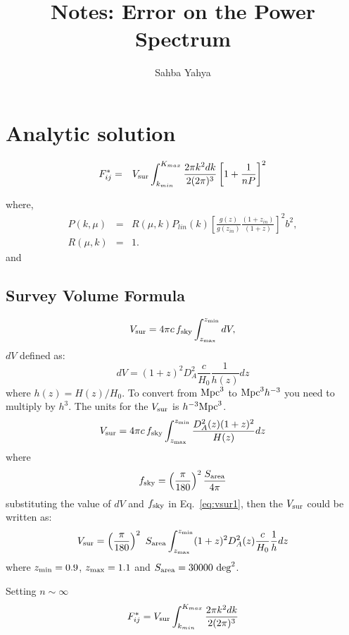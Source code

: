\documentclass[10pt,a4paper]{article}
\title{Notes: Error on the Power Spectrum}
\author{Sahba Yahya}
\begin{document}
\maketitle


\section{Analytic solution }
\begin{eqnarray}\label{FIJ_DEV}
F_{ij}^*&=& V_{\rm sur} \int_{k_{min}}^{K_{max}} \frac{ 2 \pi k^2 dk}{2 (2 \pi)^3} \left[1+\frac{1}{nP}\right]^2
\end{eqnarray}

where,
\begin{eqnarray}
P(k,\mu)&=& R(\mu,k)P_{lin}(k) \left[\frac{g(z)}{g(z_{in})} \frac{(1+z_{in})}{(1+z)}\right]^2 b^2,\\
R(\mu,k)& =&1.\label{eq:Rsig}
\end{eqnarray}
and
\subsection{Survey Volume Formula}
\begin{equation}\label{eq:vsur1}
V_{\rm sur} =4 \pi c \,f_{\rm sky} \int^{z_{\rm min}}_{z_{\rm max}} dV, 
\end{equation}
$dV$ defined as:\[dV=  (1+z)^2D_A^2 \frac{c }{H_0} \frac{1}{h(z)} dz \]
where $h(z) = H(z)/H_0$. 
To convert from ${\rm Mpc}^3$ to ${\rm Mpc}^3 h^{-3}$ you need to multiply by $h^3$. The units for the $V_{\rm sur}$ is $h^{-3} {\rm Mpc}^3$.
\begin{equation}
V_{\rm sur} = 4 \pi c \,f_{\rm sky} \int^{z_{\rm min}}_{z_{\rm max}}  \frac{D_A^2(z)( 1+z)^2}{H(z)}  dz
\end{equation}
where 
\begin{equation}
f_{\rm sky} =   \left(\frac{\pi}{180}\right)^2 \frac{S_{\rm area }}{4 \pi}
\end{equation}
substituting the value of $dV$ and $f_{\rm sky}$ in Eq.~\ref{eq:vsur1}, then the $V_{\rm sur}$ could be written as:
\begin{equation}\label{Vsurvey}
V_{\rm sur} = \left(\frac{\pi}{180}\right)^2  \ S_{\rm area}\int^{z_{\rm min}}_{z_{\rm max}} ( 1+z)^2 D_A^2(z) \frac{c }{H_0} \frac{1}{h}  dz
\end{equation}
where $z_{\rm min} = 0. 9 $,  $z_{\rm max} = 1.1 $ and $S_{\rm area} = 30000 \  {\rm deg}^2$. 

Setting $ n \sim \infty$ 
\begin{equation}
F_{ij}^*= V_{\rm sur} \int_{k_{min}}^{K_{max}}  \frac{ 2 \pi k^2 dk}{2 (2 \pi)^3}
\end{equation}
\end{document}
